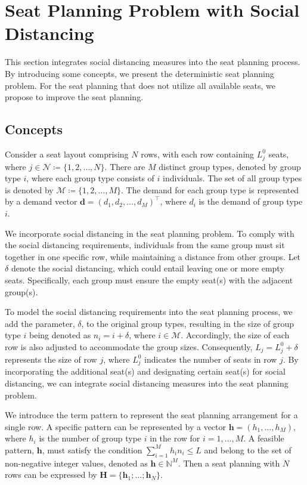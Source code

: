 \section{Seat Planning Problem with Social Distancing}
This section integrates social distancing measures into the seat planning process. By introducing some concepts, we present the deterministic seat planning problem. For the seat planning that does not utilize all available seats, we propose to improve the seat planning.

\subsection{Concepts}
Consider a seat layout comprising $N$ rows, with each row containing $L_j^0$ seats, where $j \in \mathcal{N} \coloneqq \{1,2, \ldots, N\}$. There are $M$ distinct group types, denoted by group type $i$, where each group type consists of $i$ individuals. The set of all group types is denoted by $\mathcal{M} \coloneqq \{1, 2, \ldots, M\}$. The demand for each group type is represented by a demand vector $\mathbf{d} = (d_1, d_2, \ldots, d_M)^{\intercal}$, where $d_i$ is the demand of group type $i$.


We incorporate social distancing in the seat planning problem. To comply with the social distancing requirements, individuals from the same group must sit together in one specific row, while maintaining a distance from other groups. Let $\delta$ denote the social distancing, which could entail leaving one or more empty seats. Specifically, each group must ensure the empty seat(s) with the adjacent group(s).

To model the social distancing requirements into the seat planning process, we add the parameter, $\delta$, to the original group types, resulting in the size of group type $i$ being denoted as $n_i = i + \delta$, where $i \in \mathcal{M}$. Accordingly, the size of each row is also adjusted to accommodate the group sizes. Consequently, $L_j = L_j^{0} + \delta$ represents the size of row $j$, where $L_j^{0}$ indicates the number of seats in row $j$. By incorporating the additional seat(s) and designating certain seat(s) for social distancing, we can integrate social distancing measures into the seat planning problem.

We introduce the term pattern to represent the seat planning arrangement for a single row. A specific pattern can be represented by a vector $\bm{h} = (h_1, \ldots, h_M)$, where $h_i$ is the number of group type $i$ in the row for $i = 1,\ldots, M$. A feasible pattern, $\bm{h}$, must satisfy the condition $\sum_{i=1}^{M} h_i n_i \leq L$ and belong to the set of non-negative integer values, denoted as $\bm{h} \in \mathbb{N}^{M}$. Then a seat planning with $N$ rows can be expressed by $\bm{H} = \{\bm{h}_1; \ldots; \bm{h}_N\}$.
  
